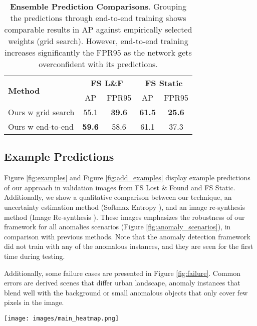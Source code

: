 \documentclass[final]{cvpr}
\begin{document}
\begin{table}[]\centering
\setlength{\tabcolsep}{3.5pt}
\begin{tabular}{lcccc}\toprule
\multirow{2}{*}{\textbf{Method}} &\multicolumn{2}{c}{\textbf{FS L\&F}} &\multicolumn{2}{c}{\textbf{FS Static}} \\
&AP &FPR95 &AP &FPR95\\ \toprule
Ours w grid search &55.1 &\textbf{39.6} &\textbf{61.5} &\textbf{25.6} \\
Ours w end-to-end &\textbf{59.6} &58.6 &61.1 &37.3 \\
\bottomrule
\end{tabular}
\caption{\textbf{Ensemble Prediction Comparisons}. Grouping the predictions through end-to-end training shows comparable results in AP against empirically selected weights (grid search). However, end-to-end training increases significantly the FPR95 as the network gets overconfident with its predictions.}
\label{tab:end-to-end}
\end{table}



\subsection{Example Predictions}

\label{app:examples}
Figure \ref{fig:examples} and Figure \ref{fig:add_examples} display example predictions of our approach in validation images from FS Lost \& Found and FS Static. Additionally, we show a qualitative comparison between our technique, an uncertainty estimation method (Softmax Entropy \cite{MSP}), and an image re-synthesis method (Image Re-synthesis \cite{epfl}). These images emphasizes the robustness of our framework for all anomalies scenarios (Figure \ref{fig:anomaly_scenarios}), in comparison with previous methods. Note that the anomaly detection framework did not train with any of the anomalous instances, and they are seen for the first time during testing. 

Additionally, some failure cases are presented in Figure \ref{fig:failure}. Common errors are derived scenes that differ urban landscape, anomaly instances that blend well with the background or small anomalous objects that only cover few pixels in the image.

\newpage

\begin{figure*}[!th]
\begin{center}
   \texttt{[image: images/main\_heatmap.png]}
\end{center}
   \caption{\textbf{Framework example predictions}. Qualitative comparison between proposed framework and baseline for uncertainty methods \cite{MSP} and image-resynthesis methods \cite{epfl}. The proposed framework outperforms both previous methods detecting anomalies instances. The first five images are from the FS Lost \& Found, while the next five are from FS Static. Pixels labeled as \textit{void} are excluded from the prediction visualizations for the three methods shown, as they are also excluded in the anomaly benchmarks.}
\label{fig:examples}
\end{figure*}
\end{document}
